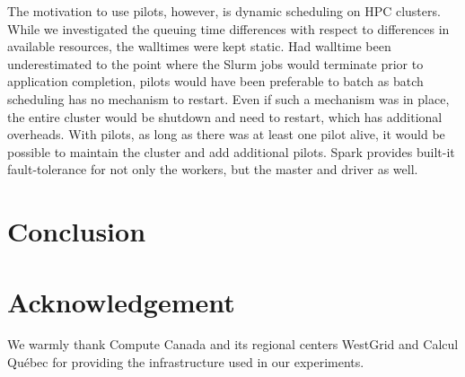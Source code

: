 \documentclass{IEEEtran}
\begin{document}
The motivation to use pilots, however, is dynamic scheduling on HPC clusters. While we
investigated the queuing time differences with respect to differences in available resources,
the walltimes were kept static. Had walltime been underestimated to the point where the Slurm jobs
would terminate prior to application completion, pilots would have been preferable to batch
as batch scheduling has no mechanism to restart. Even if such a mechanism was in place, the entire
cluster would be shutdown and need to restart, which has additional overheads. With pilots, as long as 
there was at least one pilot alive, it would be possible to maintain the cluster and add additional pilots.
Spark provides built-it fault-tolerance for not only the workers, but the master and driver as well.



\section{Conclusion}\label{sec:conclusion}

\section*{Acknowledgement}

We warmly thank Compute Canada and its regional centers WestGrid and Calcul
Qu\'ebec for providing the infrastructure used in our experiments.

 

\end{document}
